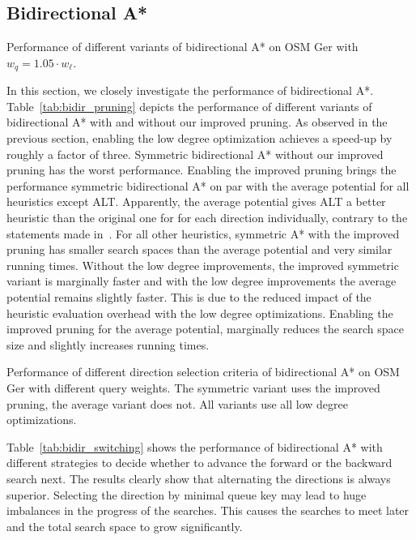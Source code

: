 \documentclass[manuscript,review]{acmart}
\begin{document}
\subsection{Bidirectional A*}

\begin{table}
\centering
\caption{Performance of different variants of bidirectional A* on OSM Ger with $w_q = 1.05 \cdot w_\ell$.}\label{tab:bidir_pruning}

\end{table}

In this section, we closely investigate the performance of bidirectional A*.
Table~\ref{tab:bidir_pruning} depicts the performance of different variants of bidirectional A* with and without our improved pruning.
As observed in the previous section, enabling the low degree optimization achieves a speed-up by roughly a factor of three.
Symmetric bidirectional A* without our improved pruning has the worst performance.
Enabling the improved pruning brings the performance symmetric bidirectional A* on par with the average potential for all heuristics except ALT.
Apparently, the average potential gives ALT a better heuristic than the original one for for each direction individually, contrary to the statements made in~\cite{gh-cspas-05}.
For all other heuristics, symmetric A* with the improved pruning has smaller search spaces than the average potential and very similar running times.
Without the low degree improvements, the improved symmetric variant is marginally faster and with the low degree improvements the average potential remains slightly faster.
This is due to the reduced impact of the heuristic evaluation overhead with the low degree optimizations.
Enabling the improved pruning for the average potential, marginally reduces the search space size and slightly increases running times.

\begin{table}
\centering
\caption{
Performance of different direction selection criteria of bidirectional A* on OSM Ger with different query weights.
The symmetric variant uses the improved pruning, the average variant does not.
All variants use all low degree optimizations.
}\label{tab:bidir_switching}

\end{table}

Table~\ref{tab:bidir_switching} shows the performance of bidirectional A* with different strategies to decide whether to advance the forward or the backward search next.
The results clearly show that alternating the directions is always superior.
Selecting the direction by minimal queue key may lead to huge imbalances in the progress of the searches.
This causes the searches to meet later and the total search space to grow significantly.
\end{document}
